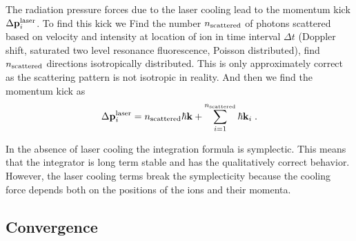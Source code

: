 \documentclass[aps, pra, preprint]{revtex4-1}
\begin{document}
The radiation pressure forces due to the laser cooling lead to
the momentum kick $\Delta \mathbf{p}_i^{\rm laser}$. To find this
kick we Find the number $n_{\rm scattered}$ of photons scattered
based on velocity and intensity at location of ion in time
interval $\Delta t$ (Doppler shift, saturated two level resonance
fluorescence, Poisson distributed), find $n_{\rm scattered}$ directions isotropically
distributed. This is only approximately correct as the scattering
pattern is not isotropic in reality. And then we find the
momentum kick as
\begin{equation}
\Delta \mathbf{p}_i^{\rm laser} = n_{\rm scattered}\hbar
\mathbf{k} + \sum_{i=1}^{n_{\rm scattered}} \hbar \mathbf{k}_i\;.
\end{equation}

In the absence of laser cooling the integration formula is
symplectic. This means that the integrator is long term stable
and has the qualitatively correct behavior. However, the laser
cooling terms break the symplecticity because the cooling force
depends both on the positions of the ions and their momenta.


\subsection{Convergence}
\end{document}
